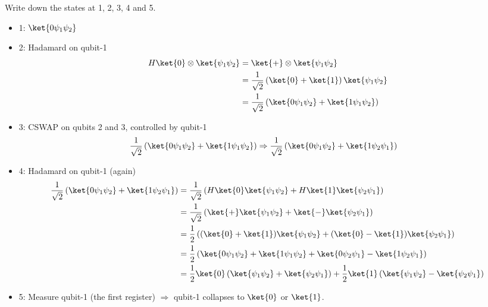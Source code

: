 \documentclass[12pt]{exam}
\begin{document}
\begin{questions}
Write down the states at 1, 2, 3, 4 and 5.

\begin{solution}
  \begin{itemize}
\item 1: $\ket{0 \psi_1 \psi_2}$
\item 2: Hadamard on qubit-1
  \begin{align*}
H\ket{0} \otimes \ket{\psi_1 \psi_2}
  &=
  \ket{+} \otimes \ket{\psi_1 \psi_2} \\
  &=
  \frac{1}{\sqrt{2}}\left( \ket{0} + \ket{1} \right) \ket{\psi_1 \psi_2} \\
  &=
  \frac{1}{\sqrt{2}}\left( \ket{0\psi_1 \psi_2} + \ket{1\psi_1 \psi_2} \right) \\
  \end{align*}
\item 3: CSWAP on qubits 2 and 3, controlled by qubit-1
  \begin{align*}
\frac{1}{\sqrt{2}}\left( \ket{0\psi_1 \psi_2} + \ket{1\psi_1 \psi_2} \right)
  &\Rightarrow
\frac{1}{\sqrt{2}}\left( \ket{0\psi_1 \psi_2} + \ket{1\psi_2 \psi_1} \right)
  \end{align*}
\item 4: Hadamard on qubit-1 (again)
  \begin{align*}
\frac{1}{\sqrt{2}}\left( \ket{0\psi_1 \psi_2} + \ket{1\psi_2 \psi_1} \right)
    &=
\frac{1}{\sqrt{2}}
  \left(
      H\ket{0}\ket{\psi_1 \psi_2}
      +
      H\ket{1}\ket{\psi_2 \psi_1}
  \right) \\
    &=
\frac{1}{\sqrt{2}}
  \left(
      \ket{+}\ket{\psi_1 \psi_2}
      +
      \ket{-}\ket{\psi_2 \psi_1}
  \right) \\
    &=
\frac{1}{2}
  \left(
      (\ket{0}+\ket{1})\ket{\psi_1 \psi_2}
      +
      (\ket{0}-\ket{1})\ket{\psi_2 \psi_1}
  \right) \\
    &=
\frac{1}{2}
  \left(
        \ket{0\psi_1 \psi_2}
      + \ket{1\psi_1 \psi_2}
      + \ket{0\psi_2 \psi_1}
      - \ket{1\psi_2 \psi_1}
  \right) \\
    &=
\frac{1}{2}\ket{0}
  \left(
    \ket{\psi_1 \psi_2} + \ket{\psi_2 \psi_1}
  \right)
+
\frac{1}{2}\ket{1}
  \left(
    \ket{\psi_1 \psi_2} - \ket{\psi_2 \psi_1}
  \right)
  \end{align*}
\item 5: Measure qubit-1 (the first register) $\Rightarrow$
  qubit-1 collapses to $\ket{0}$ or $\ket{1}$.
% 
  \end{itemize}
\end{solution}


\end{questions}
\end{document}
